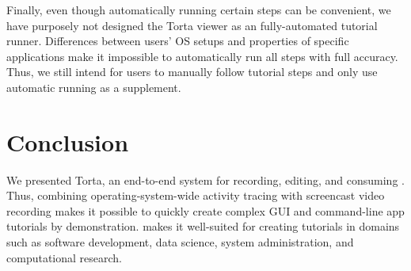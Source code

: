 Finally, even though automatically running certain steps can be
convenient, we have purposely not designed the Torta viewer as an
fully-automated tutorial runner. Differences between users' OS
setups and properties of specific applications make it impossible to
automatically run all steps with full accuracy.
Thus,
we still intend for users to manually follow tutorial steps and
only use automatic running as a supplement.


\section{Conclusion}

We presented Torta, an end-to-end system for recording, editing, and
consuming . Thus, combining operating-system-wide activity tracing with
screencast video recording makes it possible to quickly create complex
GUI and command-line app tutorials by demonstration.  makes it well-suited for creating
tutorials in domains such as software development, data science, system
administration, and computational research.
%

